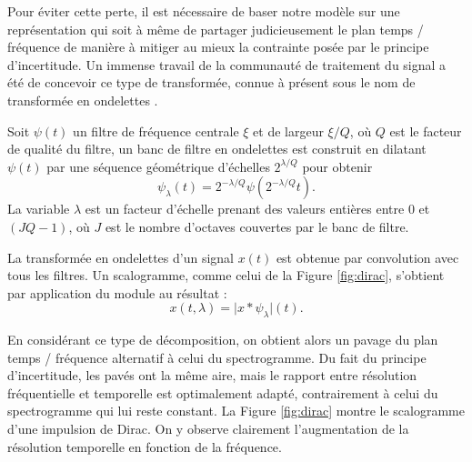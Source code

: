 Pour éviter cette perte, il est nécessaire de baser notre modèle sur une représentation qui soit à même de partager judicieusement le plan temps / fréquence de manière à mitiger au mieux la contrainte posée par le principe d'incertitude. Un immense travail de la communauté de traitement du signal a été de concevoir ce type de transformée, connue à présent sous le nom de transformée en \og ondelettes \fg.~\cite{mallat1989theory}




Soit ${\psi}(t)$ un filtre de fréquence centrale $\xi$ et de largeur $\xi/Q$, où $Q$ est le facteur de qualité du filtre, un banc de filtre en ondelettes est construit en dilatant
 ${\psi}(t)$ par une séquence géométrique d'échelles $2^{\lambda/Q}$ pour obtenir
\begin{equation}
{\psi_{\lambda}}(t) = 2^{-\lambda/Q} {\psi}(2^{-\lambda/Q} t)\mbox{.}
\end{equation}
La variable $\lambda$ est un facteur d'échelle prenant des valeurs entières entre $0$ et $(J Q - 1)$, où $J$ est le nombre d'octaves couvertes par le banc de filtre.

La transformée en ondelettes d'un signal
${x}(t)$ est obtenue par convolution avec tous les filtres. Un scalogramme, comme celui de la Figure \ref{fig:dirac}, s'obtient par application du module au résultat :
\begin{equation}
{x}(t, \lambda)
= \vert {x} \ast {\psi_{\lambda}} \vert (t)\mbox{.}
\end{equation}


En considérant ce type de décomposition, on obtient alors un pavage du plan temps / fréquence alternatif à celui du spectrogramme. Du fait du principe d'incertitude, les pavés ont la même aire, mais le rapport entre résolution fréquentielle et temporelle est optimalement adapté, contrairement à celui du spectrogramme qui lui reste constant. La Figure \ref{fig:dirac} montre le scalogramme d'une impulsion de Dirac. On y observe clairement l'augmentation de la résolution temporelle en fonction de la fréquence.

